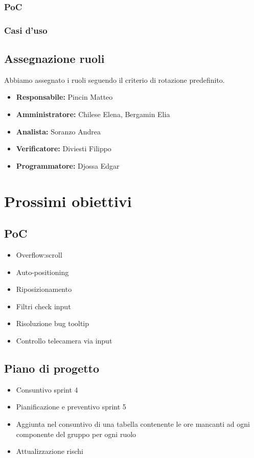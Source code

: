 \subsubsection{PoC}


\subsubsection{Casi d'uso}


\subsection{Assegnazione ruoli}
Abbiamo assegnato i ruoli seguendo il criterio di rotazione predefinito.
\begin{itemize}
    \item \textbf{Responsabile:} Pincin Matteo
    \item \textbf{Amministratore:} Chilese Elena, Bergamin Elia
    \item \textbf{Analista:} Soranzo Andrea
    \item \textbf{Verificatore:} Diviesti Filippo
    \item \textbf{Programmatore:} Djossa Edgar 
\end{itemize}

\section{Prossimi obiettivi}

\subsection{PoC}
\begin{itemize}
    \item Overflow:scroll
    \item Auto-positioning
    \item Riposizionamento
    \item Filtri check input
    \item Risoluzione bug tooltip
    \item Controllo telecamera via input
\end{itemize}

\subsection{Piano di progetto}
\begin{itemize}
    \item Consuntivo sprint 4
    \item Pianificazione e preventivo sprint 5
    \item Aggiunta nel consuntivo di una tabella contenente le ore mancanti ad ogni componente del gruppo per ogni ruolo
    \item Attualizzazione rischi
\end{itemize}

